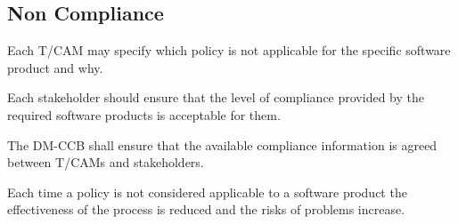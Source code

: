 \subsection{Non Compliance} \label{sec:noncompliance}

Each T/CAM may  specify which policy is not applicable for the specific software product and why.

Each stakeholder should ensure that the level of compliance provided by the required software products is acceptable for them.

The DM-CCB shall ensure that the available compliance information is agreed between T/CAMs and stakeholders.

Each time a policy is not considered applicable to a software product the effectiveness of the process is reduced and the risks of problems increase.
